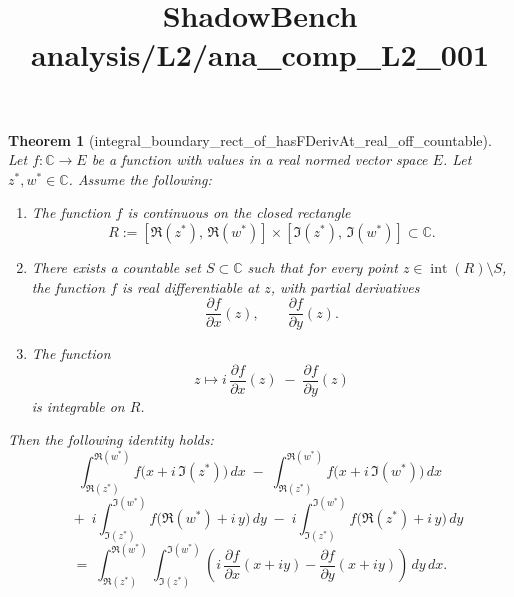\documentclass{article}
\title{ShadowBench analysis/L2/ana\_comp\_L2\_001}
\newtheorem{theorem}{Theorem}
\begin{document}
\maketitle

\begin{theorem}[integral_boundary_rect_of_hasFDerivAt_real_off_countable] Let $f : \mathbb{C} \to E$ be a function with values in a real normed vector space $E$.
Let $z^{\ast}, w^{\ast} \in \mathbb{C}$.
Assume the following:

\begin{enumerate}
  \item The function $f$ is continuous on the closed rectangle
  \[
  R := [\Re(z^{\ast}),\, \Re(w^{\ast})] \times [\Im(z^{\ast}),\, \Im(w^{\ast})] \subset \mathbb{C}.
  \]
  \item There exists a countable set $S \subset \mathbb{C}$ such that for every point $z \in \operatorname{int}(R) \setminus S$, the function $f$ is
  real differentiable at $z$, with partial derivatives
  \[
  \frac{\partial f}{\partial x}(z), \qquad \frac{\partial f}{\partial y}(z).
  \]
  \item The function
  \[
  z \longmapsto
  i\,\frac{\partial f}{\partial x}(z)
  \;-\;
  \frac{\partial f}{\partial y}(z)
  \]
  is integrable on $R$.
\end{enumerate}

Then the following identity holds:
\[
\int_{\Re(z^{\ast})}^{\Re(w^{\ast})}
f\bigl(x + i\,\Im(z^{\ast})\bigr)\,dx
\;-\;
\int_{\Re(z^{\ast})}^{\Re(w^{\ast})}
f\bigl(x + i\,\Im(w^{\ast})\bigr)\,dx
\]
\[
\quad
+\;
i \int_{\Im(z^{\ast})}^{\Im(w^{\ast})}
f\bigl(\Re(w^{\ast}) + i\,y\bigr)\,dy
\;-\;
i \int_{\Im(z^{\ast})}^{\Im(w^{\ast})}
f\bigl(\Re(z^{\ast}) + i\,y\bigr)\,dy
\]
\[
=\;
\int_{\Re(z^{\ast})}^{\Re(w^{\ast})}
\int_{\Im(z^{\ast})}^{\Im(w^{\ast})}
\left(
i\,\frac{\partial f}{\partial x}(x+iy)
-
\frac{\partial f}{\partial y}(x+iy)
\right)
\,dy\,dx.
\]
\end{theorem}
\end{document}
